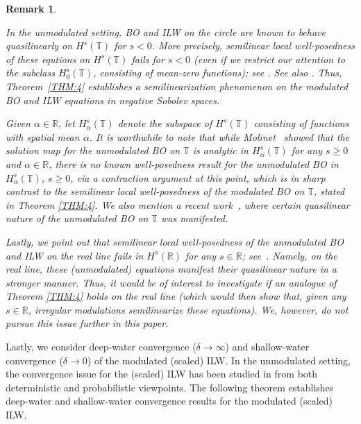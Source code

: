 \documentclass[letterpaper, 11pt,  reqno]{amsart}
\newtheorem{remark}[theorem]{Remark}
\newcommand{\1}{\hspace{0.5mm}\text{I}\hspace{0.5mm}}
\newcommand{\R}{\mathbb{R}}
\newcommand{\T}{\mathbb{T}}
\newcommand{\al}{\alpha}
\newcommand{\dl}{\delta}
\numberwithin{equation}{section}
\numberwithin{theorem}{section}
\begin{document}
\begin{remark}\label{REM:BO}\rm


In the unmodulated setting, 
BO and ILW on the circle
are known to behave 
quasilinearly
on $H^s(\T)$ for $s < 0$.
More precisely, 
semilinear local well-posedness
of these equtions
on $H^s(\T)$
fails for  $s < 0$
(even if we restrict our attention to the subclass $H^s_0(\T)$, 
consisting of mean-zero functions);
see \cite[Theorem 1.2]{Moli2}.
See also 
\cite[second paragraph on p.\,640]{Moli2}.
Thus, Theorem~\ref{THM:4}
establishes 
a semilinearization phenomenon on the modulated BO and  ILW equations
in negative Sobolev spaces.






Given $\al \in \R$, let 
$H^s_\al(\T)$
denote the subspace of  $H^s(\T)$
consisting of functions with spatial mean $\al$.
It is worthwhile to note that 
while
Molinet~\cite[Theorem~1.2]{Moli2} showed that the solution map
for the unmodulated BO on $\T$ 
is  analytic
in $H^s_\al(\T)$
for any $s \ge 0$ and $\al \in \R$, 
 there is {\it no} known well-posedness result 
for the unmodulated BO  
in $H^s_\al(\T)$, $s \ge 0$, 
  via a contraction argument
at this point,
which is in sharp contrast to 
the semilinear local well-posedness of 
the modulated BO on $\T$, stated in 
Theorem \ref{THM:4}.
We also mention a recent work~\cite{GKT24}, 
where certain quasilinear nature of the unmodulated BO on $\T$
was manifested.




Lastly, 
we point out  that 
 semilinear local well-posedness 
of the unmodulated  BO and ILW on the real line  
fails in $H^s(\R)$ for {\it any}  
 $s \in \R$; see~\cite{MST, KTz2, CHLO}.
Namely, on the real line, these (unmodulated) equations 
manifest their quasilinear nature in 
a stronger manner.
Thus, it would be of interest to investigate 
if an analogue
of 
Theorem \ref{THM:4} holds on the real line
(which would then 
show that, 
given any $s \in \R$, 
irregular modulations 
semilinearize  these equations).
We, however, do not pursue this issue further in this paper.




\end{remark}





Lastly, we consider deep-water convergence ($\dl \to \infty$)
and shallow-water convergence ($\dl \to 0$)
of the modulated (scaled) ILW.
In the unmodulated setting,  
the convergence  issue
 for the (scaled) ILW
 has been studied in 
 \cite{ABFS, Li24, LOZ,  CLOP,  FLZ, CLO, GL, HKV, CLOZ, CHLO}
from both deterministic and probabilistic viewpoints.
The following theorem establishes
deep-water 
and shallow-water convergence results
for the modulated (scaled) ILW.
\end{document}
